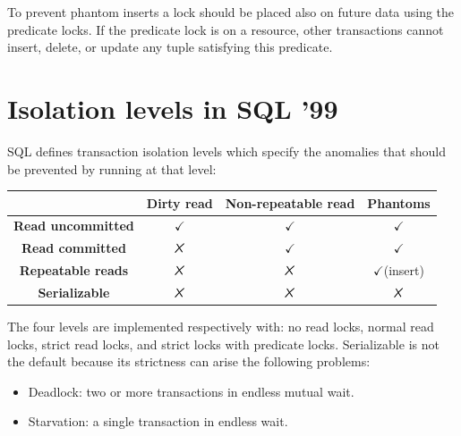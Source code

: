 \documentclass[12pt, a4paper]{report}
\begin{document}
    To prevent phantom inserts a lock should be placed also on future data using the predicate locks. If the predicate lock is on a resource, other transactions cannot insert, delete, 
    or update any tuple satisfying this predicate. 

    \section{Isolation levels in SQL '99}
    SQL defines transaction isolation levels which specify the anomalies that should be prevented by running at that level:

    \begin{table}[H]
        \centering      
        \begin{tabular}{c|ccc|}
        \cline{2-4}
                                                        & \textbf{Dirty read} & \textbf{Non-repeatable read} & \textbf{Phantoms}    \\ \hline
        \multicolumn{1}{|c|}{\textbf{Read uncommitted}} & $\checkmark$        & $\checkmark$                 & $\checkmark$         \\
        \multicolumn{1}{|c|}{\textbf{Read committed}}   & $\tikzxmark$        & $\checkmark$                 & $\checkmark$         \\
        \multicolumn{1}{|c|}{\textbf{Repeatable reads}}  & $\tikzxmark$        & $\tikzxmark$                 & $\checkmark$(insert) \\
        \multicolumn{1}{|c|}{\textbf{Serializable}}     & $\tikzxmark$        & $\tikzxmark$                 & $\tikzxmark$         \\ \hline
        \end{tabular}
    \end{table}
    The four levels are implemented respectively with: no read locks, normal read locks, strict read locks, and strict locks with predicate locks. Serializable is not the default 
    because its strictness can arise the following problems: 
    \begin{itemize}
        \item Deadlock: two or more transactions in endless mutual wait. 
        \item Starvation: a single transaction in endless wait. 
    \end{itemize}
\end{document}
